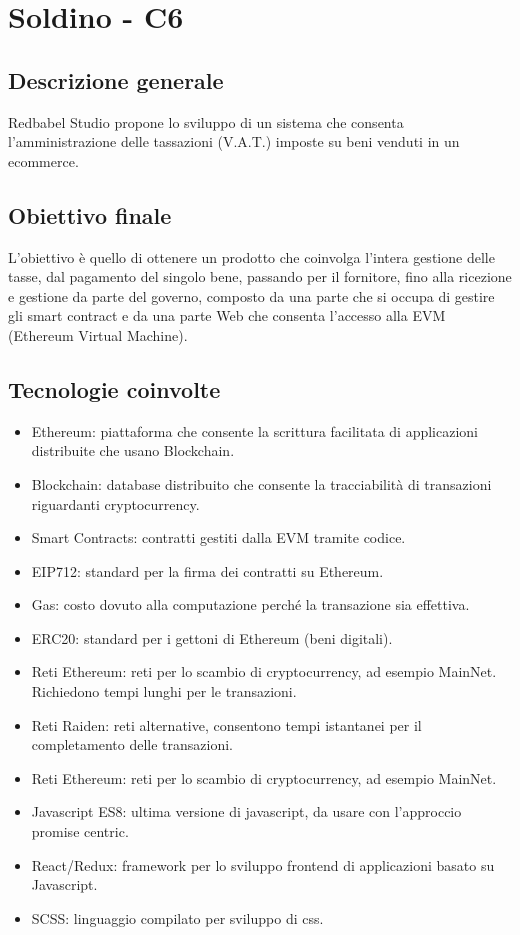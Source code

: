 \section{Soldino - C6} \label{c6}
    \subsection{Descrizione generale}
    Redbabel Studio propone lo sviluppo di un sistema che consenta l'amministrazione delle tassazioni (V.A.T.) imposte su beni venduti in un ecommerce.
    \subsection{Obiettivo finale}
    
    L'obiettivo è quello di ottenere un prodotto che coinvolga l'intera gestione delle tasse, dal pagamento del singolo bene, passando per il fornitore, fino alla ricezione e gestione da parte del governo, composto da una parte che si occupa di gestire gli smart contract e da una parte Web che consenta l'accesso alla EVM (Ethereum Virtual Machine).

    \subsection{Tecnologie coinvolte}
    	\begin{itemize}
        \item Ethereum: piattaforma che consente la scrittura facilitata di applicazioni distribuite che usano Blockchain.
		\item Blockchain: database distribuito che consente la tracciabilità di transazioni riguardanti cryptocurrency.
        \item Smart Contracts: contratti gestiti dalla EVM tramite codice.
		\item EIP712: standard per la firma dei contratti su Ethereum.
		\item Gas: costo dovuto alla computazione perché la transazione sia effettiva.
		\item ERC20: standard per i gettoni di Ethereum (beni digitali).
		\item Reti Ethereum: reti per lo scambio di cryptocurrency, ad esempio MainNet. Richiedono tempi lunghi per le transazioni.
        \item Reti Raiden: reti alternative, consentono tempi istantanei per il completamento delle transazioni.
        \item Reti Ethereum: reti per lo scambio di cryptocurrency, ad esempio MainNet.
        \item Javascript ES8: ultima versione di javascript, da usare con l'approccio promise centric.
        \item React/Redux: framework per lo sviluppo frontend di applicazioni basato su Javascript.
        \item SCSS: linguaggio compilato per sviluppo di css.
	\end{itemize}
	
